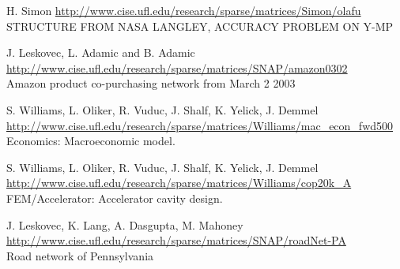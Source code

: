 	{
		{
			H. Simon
		}
		{
			\url{http://www.cise.ufl.edu/research/sparse/matrices/Simon/olafu} \\
			STRUCTURE FROM NASA LANGLEY, ACCURACY PROBLEM ON Y-MP
		}
	}

	{
		{
			J. Leskovec, L. Adamic and B. Adamic 
		}
		{
			\url{http://www.cise.ufl.edu/research/sparse/matrices/SNAP/amazon0302} \\
			Amazon product co-purchasing network from March 2 2003
		}
	}

	{
		{
			S. Williams, L. Oliker, R. Vuduc, J. Shalf, K. Yelick, J. Demmel 
		}
		{
			\url{http://www.cise.ufl.edu/research/sparse/matrices/Williams/mac_econ_fwd500} \\
			Economics: Macroeconomic model.
		}
	}

	{
		{
			S. Williams, L. Oliker, R. Vuduc, J. Shalf, K. Yelick, J. Demmel 
		}
		{
			\url{http://www.cise.ufl.edu/research/sparse/matrices/Williams/cop20k_A} \\
			FEM/Accelerator: Accelerator cavity design.
		}
	}

	{
		{
			J. Leskovec, K. Lang, A. Dasgupta, M. Mahoney 
		}
		{
			\url{http://www.cise.ufl.edu/research/sparse/matrices/SNAP/roadNet-PA} \\
			Road network of Pennsylvania
		}
	}

